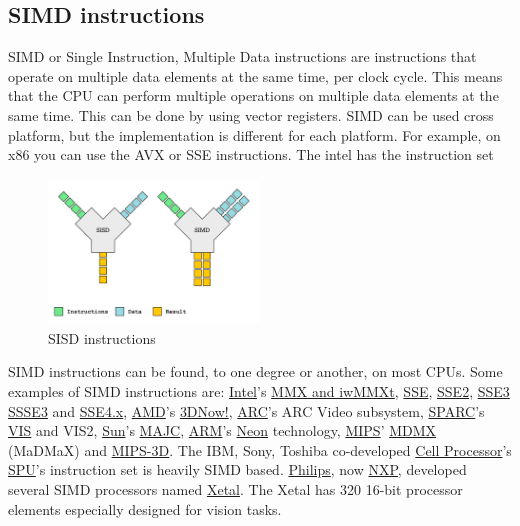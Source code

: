 \documentclass[twoside]{article}
\begin{document}
\subsection{SIMD instructions}
SIMD or Single Instruction, Multiple Data instructions are instructions that operate on multiple data elements at the same time, per clock cycle.
This means that the CPU can perform multiple operations on multiple data elements at the same time. This can be done by using vector registers.
SIMD can be used cross platform, but the implementation is different for each platform. For example, on x86 you can use the AVX or SSE instructions.
The intel has the instruction set

\begin{figure}[H]
  \centering
  \includegraphics[width=0.5\textwidth]{images/sidd.png}
  \caption{SISD instructions\cite{bogosavljevic-2022-simd}}
\end{figure}

SIMD instructions can be found, to one degree or another, on most CPUs. Some examples of SIMD instructions are:
\href{/wiki/Intel_Corporation}{Intel}'s \href{/wiki/MMX_(instruction_set)}{MMX and iwMMXt}, \href{/wiki/Streaming_SIMD_Extensions}{SSE}, \href{/wiki/SSE2}{SSE2}, \href{/wiki/SSE3}{SSE3} \href{/wiki/SSSE3}{SSSE3} and \href{/wiki/SSE4}{SSE4.x},
\href{/wiki/Advanced_Micro_Devices}{AMD}'s \href{/wiki/3DNow!}{3DNow!}, \href{/wiki/ARC_(processor)}{ARC}'s ARC Video subsystem, \href{/wiki/SPARC}{SPARC}'s \href{/wiki/Visual_Instruction_Set}{VIS} and VIS2,
\href{/wiki/Sun_Microsystems}{Sun}'s \href{/wiki/MAJC}{MAJC}, \href{/wiki/ARM_Holdings}{ARM}'s \href{/wiki/ARM_architecture\#Advanced_SIMD_(Neon)}{Neon} technology,
\href{/wiki/MIPS_architecture}{MIPS}' \href{/wiki/MDMX}{MDMX} (MaDMaX) and \href{/wiki/MIPS-3D}{MIPS-3D}. The IBM, Sony,
Toshiba co-developed \href{/wiki/Cell_(microprocessor)}{Cell Processor}'s \href{/wiki/Synergistic_Processing_Unit}{SPU}'s instruction set is heavily SIMD based.
\href{/wiki/Philips}{Philips}, now \href{/wiki/NXP_Semiconductors}{NXP}, developed several SIMD processors named \href{/wiki/Xetal}{Xetal}. The Xetal has 320 16-bit processor elements especially designed for vision tasks.\cite{wikipedia-contributors-2025-simd}
\end{document}
